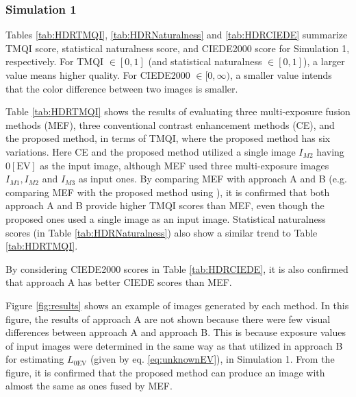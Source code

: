 \documentclass[paper]{ieice}
\begin{document}
\subsubsection{Simulation 1}
  Tables \ref{tab:HDRTMQI}, \ref{tab:HDRNaturalness} and \ref{tab:HDRCIEDE}
  summarize TMQI score, statistical naturalness score, and CIEDE2000 score
  for Simulation 1, respectively.
  For TMQI $\in [0, 1]$ (and statistical naturalness $\in [0, 1]$),
  a larger value means higher quality.
  For CIEDE2000 $\in [0, \infty)$,
  a smaller value intends that the color difference between two images is smaller.
%
  \begin{description}[style=nextline,font=\mdseries,leftmargin=0pt,listparindent=2em,parsep=1pt]
    \item[a) Comparison with multi-exposure fusion methods]
      Table \ref{tab:HDRTMQI} shows the results of evaluating
      three multi-exposure fusion methods (MEF),
      three conventional contrast enhancement methods (CE),
      and the proposed method, in terms of TMQI,
      where the proposed method has six variations.
      Here CE and the proposed method utilized a single image $I_{M2}$ having $0 \mathrm{[EV]}$
      as the input image, although MEF used three multi-exposure images
      $I_{M1}, I_{M2}$ and $I_{M3}$ as input ones.
      By comparing MEF with approach A and B
      (e.g. comparing MEF \cite{mertens2009exposure}
      with the proposed method using \cite{mertens2009exposure}),
      it is confirmed that both approach A and B provide higher TMQI scores than MEF,
      even though the proposed ones used a single image as an input image.
      Statistical naturalness scores (in Table \ref{tab:HDRNaturalness})
      also show a similar trend to Table \ref{tab:HDRTMQI}.

      By considering CIEDE2000 scores in Table \ref{tab:HDRCIEDE},
      it is also confirmed that approach A has better CIEDE scores
      than MEF.

      Figure \ref{fig:results} shows an example of images generated by each method.
      In this figure, the results of approach A are not shown because
      there were few visual differences between approach A and approach B.
      This is because exposure values of input images were determined in the same way as
      that utilized in approach B for estimating $L_{0 \mathrm{EV}}$
      (given by eq. \ref{eq:unknownEV}), in Simulation 1.
      From the figure, it is confirmed that
      the proposed method can produce an image with almost the same as ones
      fused by MEF.


\end{description}
\end{document}
